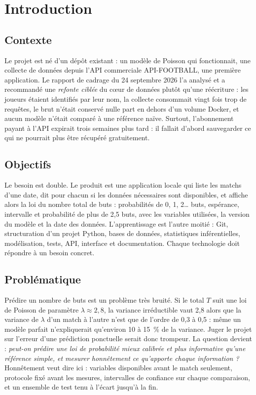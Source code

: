 
\chapter{Introduction}
\label{chap:introduction}

\section{Contexte}

Le projet est né d'un dépôt existant : un modèle de Poisson qui fonctionnait, une collecte de données
depuis l'API commerciale API-FOOTBALL, une première application. Le rapport de cadrage du 24 septembre
2026 l'a analysé et a recommandé une \emph{refonte ciblée} du cœur de données plutôt qu'une réécriture :
les joueurs étaient identifiés par leur nom, la collecte consommait vingt fois trop de requêtes, le brut
n'était conservé nulle part en dehors d'un volume Docker, et aucun modèle n'était comparé à une
référence naïve. Surtout, l'abonnement payant à l'API expirait trois semaines plus tard : il fallait
d'abord sauvegarder ce qui ne pourrait plus être récupéré gratuitement.

\section{Objectifs}

Le besoin est double. Le produit est une application locale qui liste les matchs d'une date, dit pour
chacun si les données nécessaires sont disponibles, et affiche alors la loi du nombre total de buts :
probabilités de 0, 1, 2\dots{} buts, espérance, intervalle et probabilité de plus de 2,5 buts, avec les
variables utilisées, la version du modèle et la date des données. L'apprentissage est l'autre moitié :
Git, structuration d'un projet Python, bases de données, statistiques inférentielles, modélisation,
tests, API, interface et documentation. Chaque technologie doit répondre à un besoin concret.

\section{Problématique}

Prédire un nombre de buts est un problème très bruité. Si le total \(T\) suit une loi de Poisson de
paramètre \(\lambda \approx 2{,}8\), la variance irréductible vaut 2,8 alors que la variance de
\(\lambda\) d'un match à l'autre n'est que de l'ordre de 0,3 à 0,5 : même un modèle parfait
n'expliquerait qu'environ 10 à 15~\% de la variance. Juger le projet sur l'erreur d'une prédiction
ponctuelle serait donc trompeur. La question devient : \emph{peut-on prédire une loi de probabilité
mieux calibrée et plus informative qu'une référence simple, et mesurer honnêtement ce qu'apporte chaque
information ?} \og Honnêtement \fg{} veut dire ici : variables disponibles avant le match seulement,
protocole fixé avant les mesures, intervalles de confiance sur chaque comparaison, et un ensemble de
test tenu à l'écart jusqu'à la fin.

